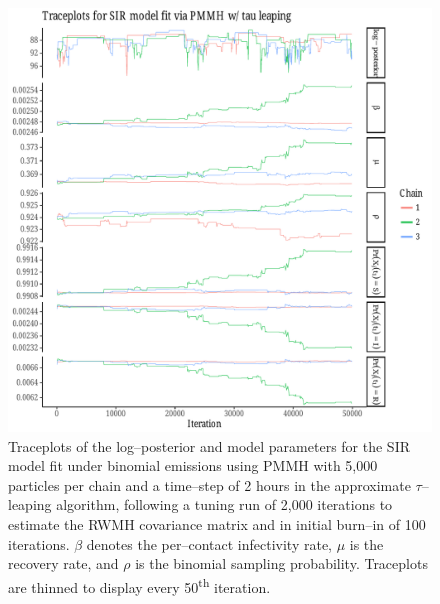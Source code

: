 \begin{figure}[htbp]
	\centering
	\includegraphics[width=\linewidth]{figures/bbs_sir_pmmh_traceplots.pdf}
	\caption[Traceplots for SIR model parameters fit to the boarding school data using PMMH.]{Traceplots of the log--posterior and model parameters for the SIR model fit under binomial emissions using PMMH with 5,000 particles per chain and a time--step of 2 hours in the approximate $ \tau $--leaping algorithm, following a tuning run of 2,000 iterations to estimate the RWMH covariance matrix and in initial burn--in of 100 iterations. $ \beta $ denotes the per--contact infectivity rate, $ \mu $ is the recovery rate, and $ \rho $ is the binomial sampling probability. Traceplots are thinned to display every 50\textsuperscript{th} iteration.}
	\label{fig:bbs_sir_pmmh_traceplots}
\end{figure}

